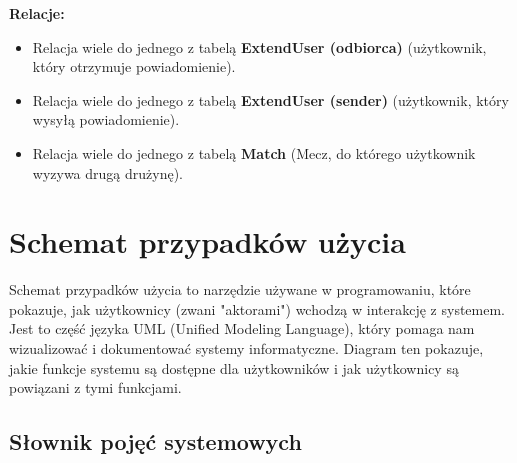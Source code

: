 \documentclass[wmii,inf,inz]{uwmthesis} %
\newenvironment{indenteditemize}
{\begin{itemize}[left=1cm]} %
{\end{itemize}}
\begin{document}
\textbf{Relacje:}
\begin{indenteditemize}
    \item Relacja wiele do jednego z tabelą \textbf{ExtendUser (odbiorca)} (użytkownik, który otrzymuje powiadomienie).
    \item Relacja wiele do jednego z tabelą \textbf{ExtendUser (sender)} (użytkownik, który wysyłą powiadomienie).
    \item Relacja wiele do jednego z tabelą \textbf{Match} (Mecz, do którego użytkownik wyzywa drugą drużynę).
\end{indenteditemize}

\section{Schemat przypadków użycia}
Schemat przypadków użycia to narzędzie używane w programowaniu, które pokazuje, jak użytkownicy (zwani "aktorami") wchodzą w interakcję z systemem. Jest to część języka UML (Unified Modeling Language), który pomaga nam wizualizować i dokumentować systemy informatyczne. Diagram ten pokazuje, jakie funkcje systemu są dostępne dla użytkowników i jak użytkownicy są powiązani z tymi funkcjami.
\subsection{Słownik pojęć systemowych}
\end{document}
